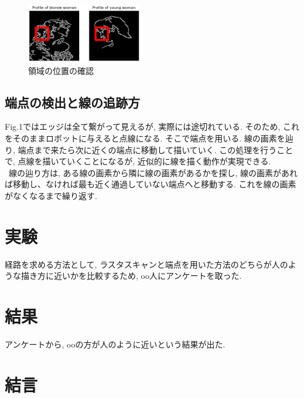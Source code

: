 \documentclass[10pt]{jarticle}
\begin{document}
    \begin{center}
        \begin{figure}[h]
            \includegraphics[width=0.45\textwidth]{img/003.png}
            \caption{領域の位置の確認}
            \label{the position of a region}
        \end{figure}
    \end{center}
	

	\subsection{端点の検出と線の追跡方}
	Fig.1ではエッジは全て繋がって見えるが, 実際には途切れている. そのため, これをそのままロボットに与えると点線になる.
	そこで端点を用いる.
	線の画素を辿り, 端点まで来たら次に近くの端点に移動して描いていく.
	この処理を行うことで, 点線を描いていくことになるが, 近似的に線を描く動作が実現できる.
  \\\  
	線の辿り方は, ある線の画素から隣に線の画素があるかを探し, 線の画素があれば移動し、なければ最も近く通過していない端点へと移動する.
	これを線の画素がなくなるまで繰り返す.
	


	\section{実験}

	経路を求める方法として, ラスタスキャンと端点を用いた方法のどちらが人のような描き方に近いかを比較するため, oo人にアンケートを取った.

	\section{結果}
	
	アンケートから, ooの方が人のように近いという結果が出た.

	\section{結\hspace{2zw}言}%
   
\end{document}

